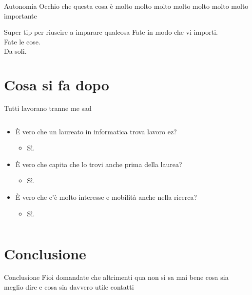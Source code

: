 \documentclass[aspectratio=1610]{beamer}
\begin{document}
	\begin{frame}{Autonomia}
		Occhio che questa cosa è molto molto molto molto molto molto molto importante
		\begin{center}
			\begin{minipage}{\textwidth}
				\begin{alertblock}{Super tip per riuscire a imparare qualcosa}
					Fate in modo che vi importi.\\
					Fate le cose.\\
					Da soli.\\
				\end{alertblock}
			\end{minipage}
		\end{center}
	\end{frame}

	\section{Cosa si fa dopo}
	\begin{frame}{Tutti lavorano tranne me sad}
		\begin{columns}
			\begin{column}{0.4\textwidth}
				\begin{itemize}
					\item<1-> È vero che un laureato in informatica trova lavoro ez?
					\begin{itemize}
						\item<2-> Sì.
					\end{itemize}
					\item<3-> È vero che capita che lo trovi anche prima della laurea?
					\begin{itemize}
						\item<4-> Sì.
					\end{itemize}
					\item<5-> È vero che c'è molto interesse e mobilità anche nella ricerca?
					\begin{itemize}
						\item<6-> Sì.
					\end{itemize}
				\end{itemize}
			\end{column}
			\begin{column}{0.6\textwidth}
				\onslide<7>{
					\centering
				}
				\end{column}
		\end{columns}
	\end{frame}

	\section{Conclusione}
	\begin{frame}{Conclusione}
	Fioi domandate che altrimenti qua non si sa mai bene cosa sia meglio dire e cosa sia davvero utile
	\vfill
	contatti	
	\end{frame}
\end{document}

